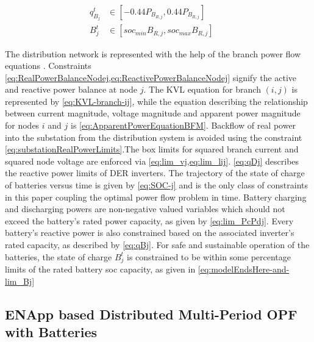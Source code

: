 \documentclass[../../outputs/main.tex]{subfiles}
\begin{document}
\begin{align}
    { q^{t}_{B_{j}} } 
    &\in 
    { \left[-0.44P_{B_{R, j}}, 0.44P_{B_{R, j}}\right] } \label{eq:qBj} && \\
    { B^{t}_{j} } &\in { \left[ soc_{min}B_{R, j}, soc_{max}B_{R, j} \right] } \label{eq:modelEndsHere-and-lim_Bj} &&
\end{align}

The distribution network is represented with the help of the branch power flow equations . Constraints \cref{eq:RealPowerBalanceNodej,eq:ReactivePowerBalanceNodej} signify the active and reactive power balance at node $j$. 
The KVL equation for branch $(i, j)$ is represented by \cref{eq:KVL-branch-ij}, while the equation describing the relationship between current magnitude, voltage magnitude and apparent power magnitude for nodes $i$ and $j$ is \cref{eq:ApparentPowerEquationBFM}. Backflow of real power into the substation from the distribution system is avoided using the constraint \cref{eq:substationRealPowerLimits}.The box limits for squared branch current and squared node voltage are enforced via \cref{eq:lim_vj,eq:lim_lij}. \cref{eq:qDj} describes the reactive power limits of DER inverters. The trajectory of the state of charge of batteries versus time is given by \cref{eq:SOC-j} and is the only class of constraints in this paper coupling the optimal power flow problem in time. Battery charging and discharging powers are non-negative valued variables which should not exceed the battery's rated power capacity, as given by \cref{eq:lim_PcPdj}. Every battery's reactive power is also constrained based on the associated inverter's rated capacity, as described by \cref{eq:qBj}. For safe and sustainable operation of the batteries, the state of charge $B^{t}_{j}$ is constrained to be within some percentage limits of the rated battery soc capacity, as given in \cref{eq:modelEndsHere-and-lim_Bj}



\subsection{ENApp based Distributed Multi-Period OPF with Batteries}
\end{document}

